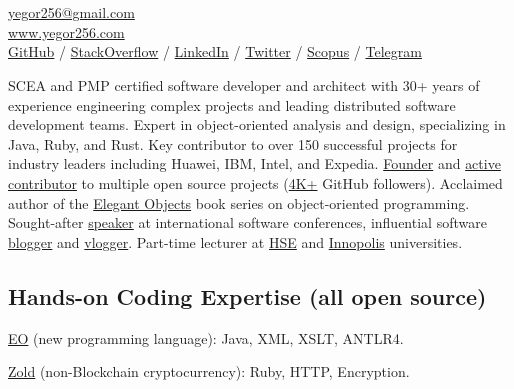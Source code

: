 \documentclass{yb}
\begin{document}
\ybPrintPhoto{}

\section*{\Large {}}

\small

\href{mailto:yegor256@gmail.com}{yegor256@gmail.com}\\%
\href{https://www.yegor256.com}{www.yegor256.com}\\%
\href{https://github.com/yegor256}{GitHub} /
\href{https://stackexchange.com/users/63162/yegor256}{StackOverflow} /
\href{https://www.linkedin.com/in/yegor256}{LinkedIn} /
\href{https://twitter.com/intent/follow?screen_name=yegor256}{Twitter} /
\href{https://www.scopus.com/authid/detail.uri?authorId=30367443600}{Scopus} /
\href{https://t.me/yegor256news}{Telegram}

\vspace*{12pt}

SCEA and PMP certified software developer and architect with 30+ years
  of experience engineering complex projects and leading distributed software development teams.
Expert in object-oriented analysis and design, specializing in Java, Ruby, and Rust.
Key contributor to over 150 successful projects for industry leaders including Huawei, IBM, Intel, and Expedia.
\href{https://www.yegor256.com/pets.html}{Founder} and
  \href{https://github.com/yegor256}{active contributor} to multiple open source
  projects (\href{https://github.com/yegor256}{4K+} GitHub followers).
Acclaimed author of the \href{https://www.yegor256.com/elegant-objects.html}
  {Elegant Objects} book series on object-oriented programming.
Sought-after \href{https://www.yegor256.com/talks.html}{speaker} at
  international software conferences, influential software
  \href{https://www.yegor256.com}{blogger} and
  \href{https://www.youtube.com/c/yegor256}{vlogger}.
Part-time lecturer at \href{https://www.hse.ru/en/}{HSE} and \href{https://innopolis.university/en/}{Innopolis} universities.

\subsection*{Hands-on Coding Expertise (all open source)}

\href{https://www.eolang.org}{EO} (new programming language):
Java, XML, XSLT, ANTLR4.

\href{https://www.zold.io}{Zold} (non-Blockchain cryptocurrency):
Ruby, HTTP, Encryption.
\end{document}
